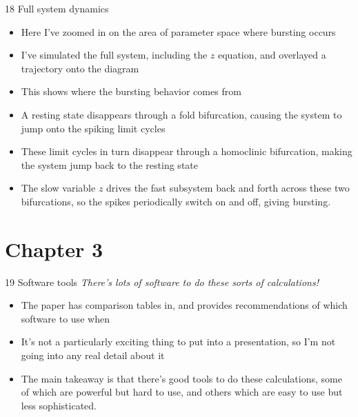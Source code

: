 \documentclass[presentation]{beamer}
\begin{document}
\begin{frame}[label={sec:org24a174d}]{18 Full system dynamics}
\begin{itemize}
\item Here I've zoomed in on the area of parameter space where bursting occurs
\item I've simulated the full system, including the \(z\) equation, and overlayed a trajectory onto the diagram
\item This shows where the bursting behavior comes from
\item A resting state disappears through a fold bifurcation, causing the system to jump onto the spiking limit cycles
\item These limit cycles in turn disappear through a homoclinic bifurcation, making the system jump back to the resting state
\item The slow variable \(z\) drives the fast subsystem back and forth across these two bifurcations, so the spikes periodically switch on and off, giving bursting.
\end{itemize}
\end{frame}

\section{Chapter 3}
\label{sec:orgb498ca4}
\begin{frame}[label={sec:org4861b79}]{19 Software tools}
\emph{There's lots of software to do these sorts of calculations!}
\begin{itemize}
\item The paper has comparison tables in, and provides recommendations of which software to use when
\item It's not a particularly exciting thing to put into a presentation, so I'm not going into any real detail about it
\item The main takeaway is that there's good tools to do these calculations, some of which are powerful but hard to use, and others which are easy to use but less sophisticated.
\end{itemize}
\end{frame}
\end{document}
